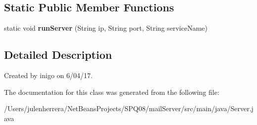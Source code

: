 \subsection*{Static Public Member Functions}
\begin{DoxyCompactItemize}
\item 
\mbox{\label{class_server_af25f1267d05a10696368d856a11328e1}} 
static void {\bfseries run\+Server} (String ip, String port, String service\+Name)
\end{DoxyCompactItemize}


\subsection{Detailed Description}
Created by inigo on 6/04/17. 

The documentation for this class was generated from the following file\+:\begin{DoxyCompactItemize}
\item 
/\+Users/julenherrera/\+Net\+Beans\+Projects/\+S\+P\+Q08/mail\+Server/src/main/java/Server.\+java\end{DoxyCompactItemize}
